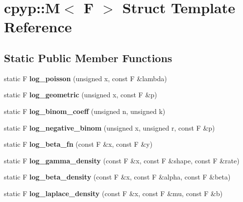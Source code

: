 \hypertarget{structcpyp_1_1_m}{}\section{cpyp\+:\+:M$<$ F $>$ Struct Template Reference}
\label{structcpyp_1_1_m}
\subsection*{Static Public Member Functions}
\begin{DoxyCompactItemize}
\item 
\mbox{\label{structcpyp_1_1_m_a81a1f190e20ae650848eb678e6408235}} 
static F {\bfseries log\+\_\+poisson} (unsigned x, const F \&lambda)
\item 
\mbox{\label{structcpyp_1_1_m_abc2e2d1ed395463fd8f29e4451df10b5}} 
static F {\bfseries log\+\_\+geometric} (unsigned x, const F \&p)
\item 
\mbox{\label{structcpyp_1_1_m_ae2860deff9e3cca142345c208830a05a}} 
static F {\bfseries log\+\_\+binom\+\_\+coeff} (unsigned n, unsigned k)
\item 
\mbox{\label{structcpyp_1_1_m_a4d12588f6bf701ef4b5e284a0414e9ae}} 
static F {\bfseries log\+\_\+negative\+\_\+binom} (unsigned x, unsigned r, const F \&p)
\item 
\mbox{\label{structcpyp_1_1_m_aaaa3dab7a088adfc357c53b8a31d68d3}} 
static F {\bfseries log\+\_\+beta\+\_\+fn} (const F \&x, const F \&y)
\item 
\mbox{\label{structcpyp_1_1_m_ae3325100c91ddc80be0501208506ee02}} 
static F {\bfseries log\+\_\+gamma\+\_\+density} (const F \&x, const F \&shape, const F \&rate)
\item 
\mbox{\label{structcpyp_1_1_m_abc9a4d567277c8b1604554857d8d5d0f}} 
static F {\bfseries log\+\_\+beta\+\_\+density} (const F \&x, const F \&alpha, const F \&beta)
\item 
\mbox{\label{structcpyp_1_1_m_a2b73db507fdab82daab52214be2b1b50}} 
static F {\bfseries log\+\_\+laplace\+\_\+density} (const F \&x, const F \&mu, const F \&b)

\end{DoxyCompactItemize}
